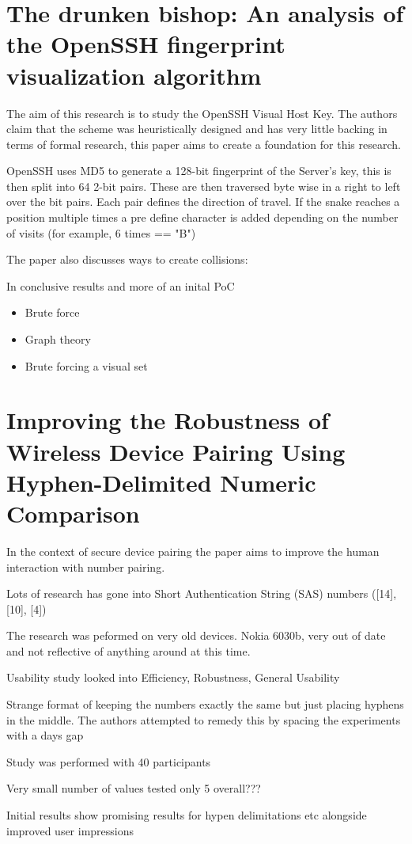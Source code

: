 \newpage

\section{The drunken bishop: An analysis of the OpenSSH
fingerprint visualization algorithm}

The aim of this research is to study the OpenSSH Visual Host Key. The authors claim that the scheme was heuristically designed and has very little backing in terms of formal research, this paper aims to create a foundation for this research.

OpenSSH uses MD5 to generate a 128-bit fingerprint of the Server's key, this is then split into 64 2-bit pairs. These are then traversed byte wise in a right to left over the bit pairs. Each pair defines the direction of travel. If the snake reaches a position multiple times a pre define character is added depending on the number of visits (for example, 6 times == "B")

The paper also discusses ways to create collisions:

In conclusive results and more of an inital PoC

\begin{itemize}
    \item Brute force
    \item Graph theory
    \item Brute forcing a visual set
\end{itemize}

\newpage

\section{Improving the Robustness of Wireless Device
Pairing Using Hyphen-Delimited Numeric
Comparison}

In the context of secure device pairing the paper aims to improve the human interaction with number pairing.

Lots of research has gone into Short Authentication String (SAS) numbers ([14], [10], [4])

The research was peformed on very old devices. Nokia 6030b, very out of date and not reflective of anything around at this time.

Usability study looked into Efficiency, Robustness, General Usability

Strange format of keeping the numbers exactly the same but just placing hyphens in the middle. The authors attempted to remedy this by spacing the experiments with a days gap

Study was performed with 40 participants

Very small number of values tested only 5 overall???

Initial results show promising results for hypen delimitations etc alongside improved user impressions
